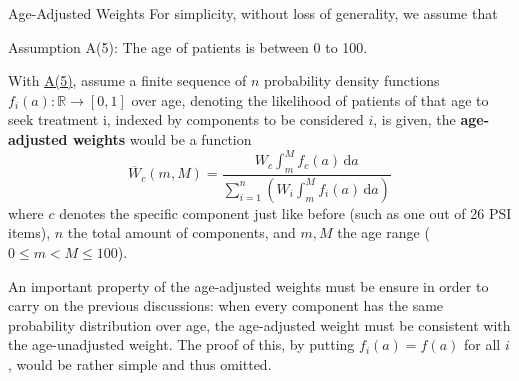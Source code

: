 \documentclass[8pt, hyperref={colorlinks=true}]{beamer}
\begin{document}
\begin{frame}{Age-Adjusted Weights}
For simplicity, without loss of generality, we assume that
\begin{block}{Assumption}
\hypertarget{asp:age_0_100}{}
A(5): The age of patients is between 0 to 100.
\end{block}

\begin{definition}
With \hyperlink{asp:age_0_100}{A(5)}, assume a finite sequence of $n$ probability density functions ${f_i(a)}:\mathbb{R}\to[0,1]$ over age, denoting the likelihood of patients of that age to seek treatment i, indexed by components to be considered $i$, is given, the \textbf{age-adjusted weights} would be a function
\[
\overline{W}_c(m,M)=\frac{\displaystyle W_c\int_m^M \! f_c\left(a\right)\, \mathrm{d}a}{\displaystyle\sum_{i=1}^{n}\left(W_i\int_m^M \! f_i\left(a\right)\, \mathrm{d}a\right)}
\]
where $c$ denotes the specific component just like before (such as one out of 26 PSI items), $n$ the total amount of components, and $m, M$ the age range ($0\leq m<M\leq 100$).
\end{definition}

An important property of the age-adjusted weights must be ensure in order to carry on the previous discussions: when every component has the same probability distribution over age, the age-adjusted weight must be consistent with the age-unadjusted weight. The proof of this, by putting $f_i(a)=f(a)$ for all $i$, would be rather simple and thus omitted.
\end{frame}

\end{document}
